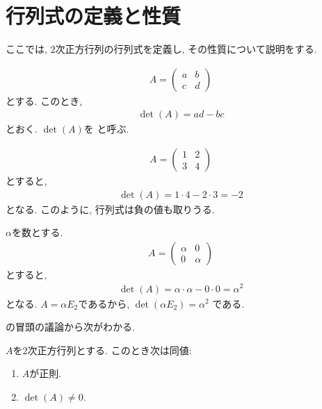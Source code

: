 \section{行列式の定義と性質}
ここでは, $2$次正方行列の行列式を定義し,
その性質について説明をする.
\begin{definition}
  \label{def:det:2}
  \begin{align*}
    A=
  \begin{pmatrix}
    a&b\\c&d
  \end{pmatrix}
  \end{align*}
  とする.  このとき,
  \begin{align*}
    \det(A)=ad-bc
  \end{align*}
  とおく.
  $\det(A)$を
  と呼ぶ.
\end{definition}
\begin{example}
  \begin{align*}
    A=\begin{pmatrix}1&2\\3&4\end{pmatrix}
  \end{align*}
  とすると,
  \begin{align*}
    \det(A)=1\cdot 4 -2\cdot 3=-2
  \end{align*}
  となる.
  このように, 行列式は負の値も取りうる.
\end{example}

\begin{example}
  $\alpha$を数とする.
  \begin{align*}
    A=\begin{pmatrix}\alpha &0\\0&\alpha\end{pmatrix}
  \end{align*}
  とすると,
  \begin{align*}
    \det(A)=\alpha\cdot\alpha-0\cdot0=\alpha^2
  \end{align*}
  となる. $A=\alpha E_2$であるから,
  $\det(\alpha E_2)=\alpha^2$
  である.
\end{example}

の冒頭の議論から次がわかる.
\begin{theorem}
  \label{thm:det:reg}
  $A$を$2$次正方行列とする.
  このとき次は同値:
  \begin{enumerate}
  \item $A$が正則.
  \item $\det(A)\neq 0$.
  \end{enumerate}
\end{theorem}

